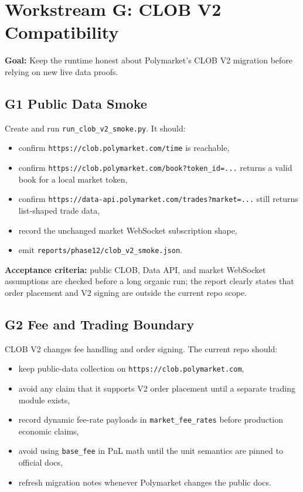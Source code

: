 \documentclass{article}
\begin{document}
\section*{Workstream G: CLOB V2 Compatibility}
\textbf{Goal:} Keep the runtime honest about Polymarket's CLOB V2 migration before relying on new live data proofs.

\subsection*{G1 Public Data Smoke}
Create and run \texttt{run\_clob\_v2\_smoke.py}. It should:
\begin{itemize}[nosep]
\item confirm \texttt{https://clob.polymarket.com/time} is reachable,
\item confirm \texttt{https://clob.polymarket.com/book?token\_id=...} returns a valid book for a local market token,
\item confirm \texttt{https://data-api.polymarket.com/trades?market=...} still returns list-shaped trade data,
\item record the unchanged market WebSocket subscription shape,
\item emit \texttt{reports/phase12/clob\_v2\_smoke.json}.
\end{itemize}

\textbf{Acceptance criteria:} public CLOB, Data API, and market WebSocket assumptions are checked before a long organic run; the report clearly states that order placement and V2 signing are outside the current repo scope.

\subsection*{G2 Fee and Trading Boundary}
CLOB V2 changes fee handling and order signing. The current repo should:
\begin{itemize}[nosep]
\item keep public-data collection on \texttt{https://clob.polymarket.com},
\item avoid any claim that it supports V2 order placement until a separate trading module exists,
\item record dynamic fee-rate payloads in \texttt{market\_fee\_rates} before production economic claims,
\item avoid using \texttt{base\_fee} in PnL math until the unit semantics are pinned to official docs,
\item refresh migration notes whenever Polymarket changes the public docs.
\end{itemize}
\end{document}
